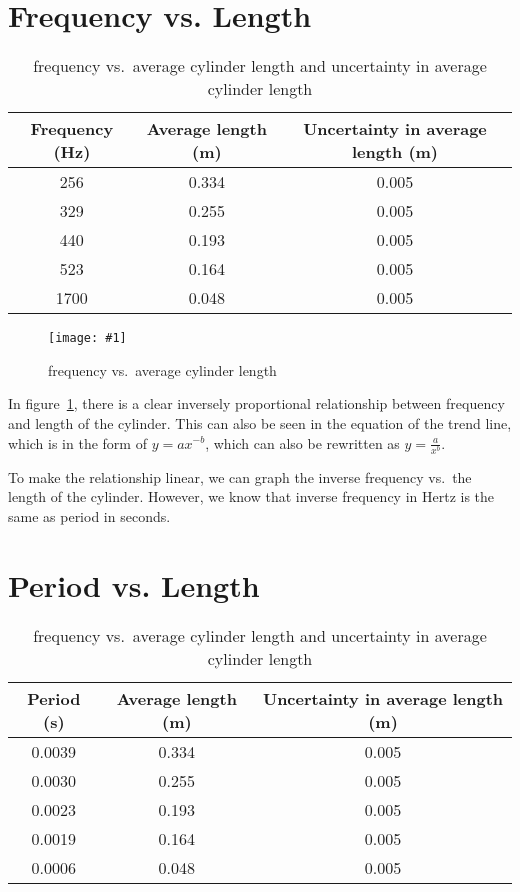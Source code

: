 \documentclass{report}
\newcommand{\graph}[2]{
  \begin{figure}[H]
    \medskip
    \centering
    \texttt{[image: \#1]}
    \caption{#2}
    \medskip\label{fig:#1}
  \end{figure}
}
\begin{document}
\section{Frequency vs. Length}\label{sec:freq-vs-length}

\begin{table}[H]
  \centering
  \begin{tabular}{@{}ccc@{}}
    \toprule
    Frequency (Hz) & Average length (m) & Uncertainty in average
    length (m) \\
    \midrule
    256 & 0.334 & 0.005 \\
    329 & 0.255 & 0.005 \\
    440 & 0.193 & 0.005 \\
    523 & 0.164 & 0.005 \\
    1700 & 0.048 & 0.005 \\
    \bottomrule
  \end{tabular}
  \caption{frequency vs.\ average cylinder length and uncertainty in
  average cylinder length}\label{tab:freq-vs-length}
\end{table}

\graph{freq-vs-length}{frequency vs.\ average cylinder length}

In figure~\ref{fig:freq-vs-length}, there is a clear inversely proportional
relationship between frequency and length of the cylinder. This can
also be seen in the equation of the trend line, which is in the form
of \(y=ax^{-b}\), which can also be rewritten as \(y=\frac{a}{x^b}\).

To make the relationship linear, we can graph the inverse frequency
vs.\ the length of the cylinder. However, we know that inverse
frequency in Hertz is the same as period in seconds.

\section{Period vs. Length}

\begin{table}[H]
  \centering
  \begin{tabular}{@{}ccc@{}}
    \toprule
    Period (s) & Average length (m) & Uncertainty in average length (m) \\
    \midrule
    0.0039 & 0.334 & 0.005 \\
    0.0030 & 0.255 & 0.005 \\
    0.0023 & 0.193 & 0.005 \\
    0.0019 & 0.164 & 0.005 \\
    0.0006 & 0.048 & 0.005 \\
    \bottomrule
  \end{tabular}
  \caption{frequency vs.\ average cylinder length and uncertainty in
  average cylinder length}\label{tab:period-vs-length}
\end{table}
\end{document}
